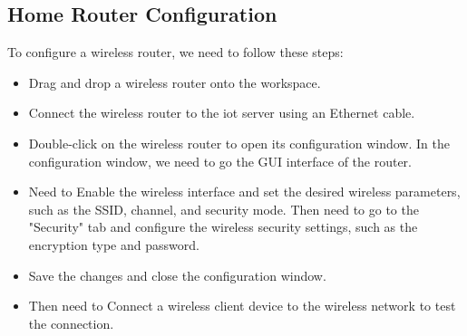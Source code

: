 \documentclass{report}
\begin{document}
\subsection{Home Router Configuration}
To configure a wireless router, we need to follow these steps:\\
\begin{itemize}
    \item Drag and drop a wireless router onto the workspace.
    \item Connect the wireless router to the iot server using an Ethernet cable.
    \item Double-click on the wireless router to open its configuration window. In the configuration window, we need to go the GUI interface of the router.
    \item Need to Enable the wireless interface and set the desired wireless parameters, such as the SSID, channel, and security mode. Then need to go to the "Security" tab and configure the wireless security settings, such as the encryption type and password.
    \item Save the changes and close the configuration window.
    \item Then need to Connect a wireless client device to the wireless network to test the connection.
\end{itemize}
\end{document}
